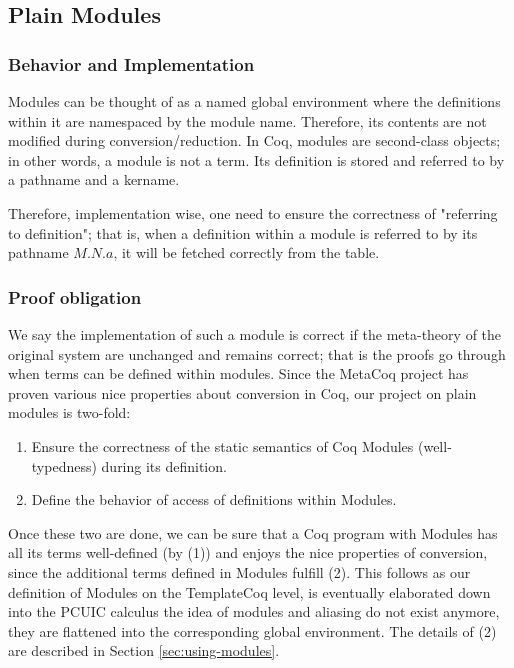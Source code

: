 \subsection{Plain Modules}
\label{sec:plainmodules}

\subsubsection{Behavior and Implementation}

Modules can be thought of as a named global environment where the definitions
within it are namespaced by the module name. Therefore, its contents are not
modified during conversion/reduction.  In Coq, modules are second-class objects;
in other words, a module is not a term.  Its definition is stored and referred
to by a pathname and a kername.

Therefore, implementation wise, one need to ensure the correctness of "referring
to definition"; that is, when a definition within a module is referred to by its
pathname $M.N.a$, it will be fetched correctly from the table.

\subsubsection{Proof obligation}

We say the implementation of such a module is correct if the meta-theory of the
original system are unchanged and remains correct; that is the proofs go through
when terms can be defined within modules. Since the MetaCoq project has proven
various nice properties about conversion in Coq, our project on plain modules is
two-fold:

\begin{enumerate}
\item Ensure the correctness of the static semantics of Coq Modules
(well-typedness) during its definition.
\item Define the behavior of access of definitions within Modules.
\end{enumerate}

Once these two are done, we can be sure that a Coq program with Modules
has all its terms well-defined (by (1)) and enjoys the nice properties of
conversion, since the additional terms defined in Modules fulfill (2).
This follows as our definition of Modules on the TemplateCoq level, is
eventually elaborated down into the PCUIC calculus the idea of modules and
aliasing do not exist anymore, they are flattened into the corresponding global
environment. The details of (2) are described in Section \ref{sec:using-modules}.

